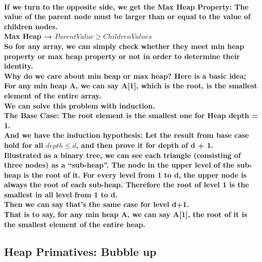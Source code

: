 \documentclass{article}
\begin{document}
\paragraph{If we turn to the opposite side, we get the Max Heap Property: The value of the parent node must be larger than or equal to the value of children nodes.\\
Max Heap → $ParentValue \geq ChildrenValues$\\
So for any array, we can simply check whether they meet min heap property or max heap property or not in order to determine their identity.\\
Why do we care about min heap or max heap? Here is a basic idea;\\
For any min heap A, we can say A[1], which is the root, is the smallest element of the entire array.\\
We can solve this problem with induction.\\
The Base Case: The root element is the smallest one for Heap depth = 1.\\
And we have the induction hypothesis: Let the result from base case hold for all $depth \leq d$, and then prove it for depth of d + 1.\\
Illustrated as a binary tree, we can see each triangle (consisting of three nodes) as a “sub-heap”. The node in the upper level of the sub-heap is the root of it. 
For every level from 1 to d, the upper node is always the root of each sub-heap. Therefore the root of level 1 is the smallest in all level from 1 to d.\\
Then we can say that's the same case for level d+1.\\
That is to say, for any min heap A, we can say A[1], the root of it is the smallest element of the entire heap.}

\subsection{Heap Primatives: Bubble up}
\end{document}
